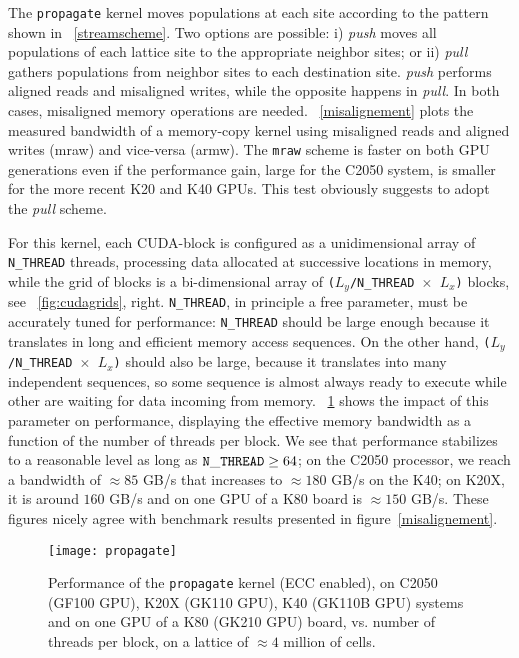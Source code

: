 \documentclass{elsarticle}
\begin{document}
The {\tt propagate} kernel moves populations at each site according to 
the pattern shown in \figurename~\ref{streamscheme}. Two options are possible:
i) {\em push} moves all populations of each lattice site to the appropriate 
neighbor sites; 
or ii) {\em pull} gathers populations from neighbor sites to each destination site. 
%
{\em push} performs aligned reads and misaligned writes, while the opposite happens in {\em pull}. In 
both cases, misaligned memory operations are needed. 
%
\figurename~\ref{misalignement} plots the measured bandwidth 
of a memory-copy kernel using misaligned reads  
and aligned writes (mraw) and vice-versa (armw). 
%
The {\tt mraw} scheme is faster on both GPU generations even if the 
performance gain, large for the C2050 system, is smaller for the 
more recent K20 and K40 GPUs.
%
This test obviously suggests to adopt the {\em pull} scheme.

For this kernel, each CUDA-block is configured as a 
unidimensional array of {\tt N\_THREAD} threads, processing data allocated 
at successive locations in memory, while the grid of blocks is a bi-dimensional 
array of {\tt ($L_y$/N\_THREAD $\times$ $L_x$)} blocks, 
see \figurename~\ref{fig:cudagrids}, right.
%
{\tt N\_THREAD}, in principle a free parameter, must be accurately 
tuned for performance: {\tt N\_THREAD} should be large enough because 
it translates in long and efficient memory access sequences. On the 
other hand, {\tt ($L_y$/N\_THREAD $\times$ $L_x$)} should also be large, 
because it translates into many independent sequences, so some sequence 
is almost always ready to execute while other are waiting for data 
incoming from memory.
\figurename~\ref{propagate-bench} shows the impact of this parameter 
on performance, displaying the effective memory bandwidth as a function 
of the number of threads per block.
We see that performance
stabilizes to a reasonable level as long as ${\tt N\_THREAD} \ge 64$;
on the C2050 processor, we reach a bandwidth of $\approx 85$ GB/s
that increases to $\approx 180$ GB/s on the K40; on K20X, it is around 
$160$ GB/s and on one GPU of a K80 board is $\approx 150$ GB/s. These figures 
nicely agree with benchmark results presented in figure~\ref{misalignement}.

%
\begin{figure}
\texttt{[image: propagate]}
\caption{
\label{propagate-bench}
Performance of the {\tt propagate} kernel (ECC enabled), 
on C2050 (GF100 GPU), K20X (GK110 GPU), K40 (GK110B GPU) systems 
and on one GPU of a K80 (GK210 GPU) board, vs. number of threads per block, 
on a lattice of $\approx 4$ million of cells.
}
\end{figure}
%
\end{document}
